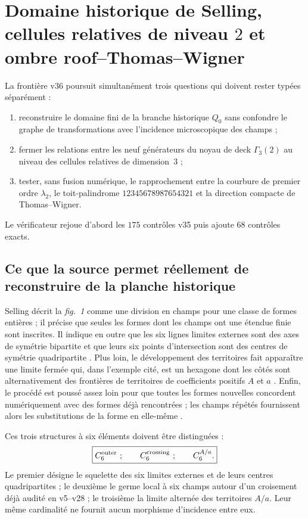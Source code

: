 \documentclass[11pt,a4paper]{article}
\begin{document}
\section{Domaine historique de Selling, cellules relatives de niveau $2$ et ombre roof--Thomas--Wigner}
\label{sec:v36-selling-domain-roof}

La frontière v36 poursuit simultanément trois questions qui doivent rester typées séparément :
\begin{enumerate}[label=\textup{(\roman*)}]
\item reconstruire le domaine fini de la branche historique $Q_0$ sans confondre le graphe de transformations avec l'incidence microscopique des champs ;
\item fermer les relations entre les neuf générateurs du noyau de deck $\Gamma_3(2)$ au niveau des cellules relatives de dimension~$3$ ;
\item tester, sans fusion numérique, le rapprochement entre la courbure de premier ordre $\lambda_2$, le toit-palindrome $12345678987654321$ et la direction compacte de Thomas--Wigner.
\end{enumerate}
Le vérificateur  rejoue d'abord les $175$ contrôles v35 puis ajoute $68$ contrôles exacts.

\subsection{Ce que la source permet réellement de reconstruire de la planche historique}

Selling décrit la \emph{fig.~1} comme une division en champs pour une classe de formes entières ; il précise que seules les formes dont les champs ont une étendue finie sont inscrites. Il indique en outre que les six lignes limites externes sont des axes de symétrie bipartite et que leurs six points d'intersection sont des centres de symétrie quadripartite \cite{Selling1877}. Plus loin, le développement des territoires fait apparaître une limite fermée qui, dans l'exemple cité, est un hexagone dont les côtés sont alternativement des frontières de territoires de coefficients positifs $A$ et $a$ \cite{Selling1877}. Enfin, le procédé est poussé assez loin pour que toutes les formes nouvelles concordent numériquement avec des formes déjà rencontrées ; les champs répétés fournissent alors les substitutions de la forme en elle-même \cite{Selling1877}.

Ces trois structures à six éléments doivent être distinguées :
\[
\boxed{
 C_6^{\rm outer}\ ;\qquad C_6^{\rm crossing}\ ;\qquad C_6^{A/a}.
}
\]
Le premier désigne le squelette des six limites externes et de leurs centres quadripartites ; le deuxième le germe local à six champs autour d'un croisement déjà audité en v5--v28 ; le troisième la limite alternée des territoires $A/a$. Leur même cardinalité ne fournit aucun morphisme d'incidence entre eux.
\end{document}
